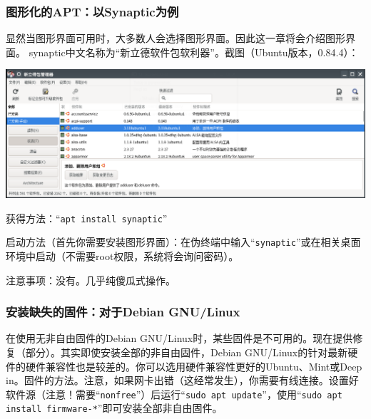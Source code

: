 \subsubsection{图形化的APT：以Synaptic为例}
显然当图形界面可用时，大多数人会选择图形界面。因此这一章将会介绍图形界面。
synaptic中文名称为“新立德软件包软利器”。截图（Ubuntu版本，0.84.4）：
\begin{center}
\includegraphics[scale=0.5]{pic/synaptic.png} 	
\end{center} \par
获得方法：“\verb|apt install synaptic|” \par
启动方法（首先你需要安装图形界面）：在伪终端中输入“\verb|synaptic|”或在相关桌面环境中启动（不需要root权限，系统将会询问密码）。\par
注意事项：没有。几乎纯傻瓜式操作。
\subsubsection{安装缺失的固件：对于Debian GNU/Linux}
在使用无非自由固件的Debian GNU/Linux时，某些固件是不可用的。现在提供修复（部分）。其实即使安装全部的非自由固件，Debian GNU/Linux的针对最新硬件的硬件兼容性也是较差的。你可以选用硬件兼容性更好的Ubuntu、Mint或Deep in。固件的方法。注意，如果网卡出错（这经常发生），你需要有线连接。设置好软件源（注意！需要“\verb|nonfree|”）后运行“\verb|sudo apt update|”，使用“\verb|sudo apt install firmware-*|”即可安装全部非自由固件。

